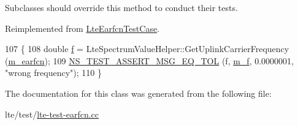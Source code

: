 Subclasses should override this method to conduct their tests. 

Reimplemented from \hyperlink{classLteEarfcnTestCase_a36386da997b4f57ab0fd57ae5c44d73f}{Lte\+Earfcn\+Test\+Case}.


\begin{DoxyCode}
107 \{
108   \textcolor{keywordtype}{double} \hyperlink{buildings__pathloss_8m_aa52d3a6e3de5a80a97c12364caeaa125}{f} = LteSpectrumValueHelper::GetUplinkCarrierFrequency (\hyperlink{classLteEarfcnTestCase_ab4fea55308ce0ef622597e722b19d005}{m\_earfcn});
109   \hyperlink{group__testing_ga9e7861b56b4e70db3b56044cb7a28e41}{NS\_TEST\_ASSERT\_MSG\_EQ\_TOL} (f, \hyperlink{classLteEarfcnTestCase_a98327c6792af6dd6d3eb5ed3772b0960}{m\_f}, 0.0000001, \textcolor{stringliteral}{"wrong frequency"});
110 \}
\end{DoxyCode}


The documentation for this class was generated from the following file\+:\begin{DoxyCompactItemize}
\item 
lte/test/\hyperlink{lte-test-earfcn_8cc}{lte-\/test-\/earfcn.\+cc}\end{DoxyCompactItemize}
